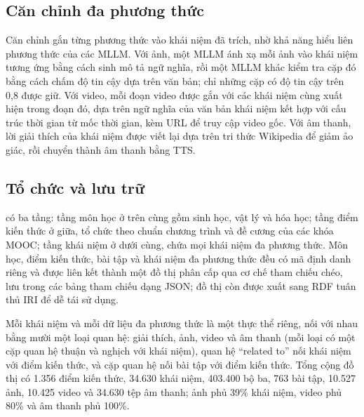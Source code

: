 \subsection{Căn chỉnh đa phương thức}\label{sec:sm-align}
Căn chỉnh gắn từng phương thức vào khái niệm đã trích, nhờ khả năng hiểu liên phương thức của các MLLM.
Với ảnh, một MLLM ánh xạ mỗi ảnh vào khái niệm tương ứng bằng cách sinh mô tả ngữ nghĩa, rồi một MLLM khác kiểm tra cặp đó bằng cách chấm độ tin cậy dựa trên văn bản; chỉ những cặp có độ tin cậy trên 0,8 được giữ.
Với video, mỗi đoạn video được gắn với các khái niệm cùng xuất hiện trong đoạn đó, dựa trên ngữ nghĩa của văn bản khái niệm kết hợp với cấu trúc thời gian từ mốc thời gian, kèm URL để truy cập video gốc.
Với âm thanh, lời giải thích của khái niệm được viết lại dựa trên tri thức Wikipedia để giảm ảo giác, rồi chuyển thành âm thanh bằng TTS.

\subsection{Tổ chức và lưu trữ}\label{sec:sm-store}
\SM{} có ba tầng: tầng môn học ở trên cùng gồm sinh học, vật lý và hóa học; tầng điểm kiến thức ở giữa, tổ chức theo chuẩn chương trình và đề cương của các khóa MOOC; tầng khái niệm ở dưới cùng, chứa mọi khái niệm đa phương thức.
Môn học, điểm kiến thức, bài tập và khái niệm đa phương thức đều có mã định danh riêng và được liên kết thành một đồ thị phân cấp qua cơ chế tham chiếu chéo, lưu trong các bảng tham chiếu dạng JSON; đồ thị còn được xuất sang RDF tuân thủ IRI để dễ tái sử dụng.

Mỗi khái niệm và mỗi dữ liệu đa phương thức là một thực thể riêng, nối với nhau bằng mười một loại quan hệ: giải thích, ảnh, video và âm thanh (mỗi loại có một cặp quan hệ thuận và nghịch với khái niệm), quan hệ ``related to'' nối khái niệm với điểm kiến thức, và cặp quan hệ nối bài tập với điểm kiến thức.
Tổng cộng đồ thị có 1.356 điểm kiến thức, 34.630 khái niệm, 403.400 bộ ba, 763 bài tập, 10.527 ảnh, 10.425 video và 34.630 tệp âm thanh; ảnh phủ 39\% khái niệm, video phủ 80\% và âm thanh phủ 100\%.

